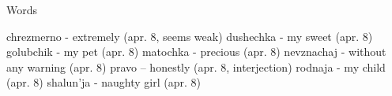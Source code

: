 Words

chrezmerno - extremely (apr. 8, seems weak)
dushechka - my sweet (apr. 8)
golubchik - my pet (apr. 8)
matochka - precious (apr. 8)
nevznachaj - without any warning (apr. 8)
pravo -- honestly (apr. 8, interjection)
rodnaja - my child (apr. 8)
shalun'ja - naughty girl (apr. 8)